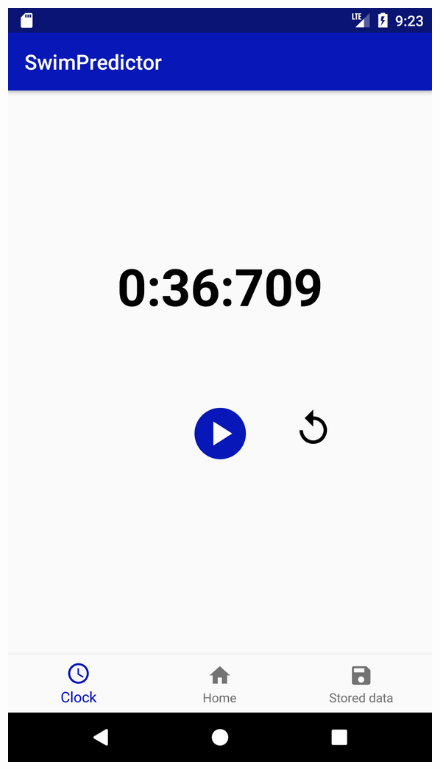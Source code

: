 \begin{figure}[ht]
\centering
\begin{minipage}{0.2\textwidth}
\includegraphics[width=\textwidth]{visualisation/stopwatch_view.png}
\end{minipage}
\begin{minipage}{0.2\textwidth}

\end{minipage}
\end{figure}
